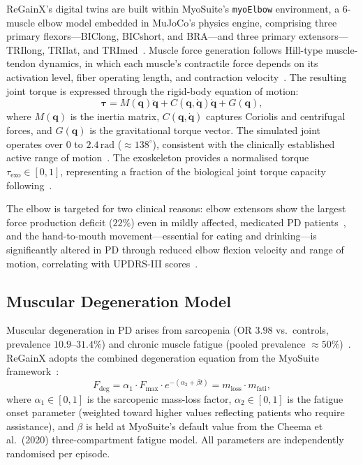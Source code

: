 \documentclass{article}
\begin{document}
ReGainX's digital twins are built within MyoSuite's \texttt{myoElbow}
environment, a 6-muscle elbow model embedded in MuJoCo's physics engine,
comprising three primary flexors---BIClong, BICshort, and BRA---and three
primary extensors---TRIlong, TRIlat, and TRImed~\citep{caggiano2022}.
Muscle force generation follows Hill-type muscle-tendon dynamics, in which
each muscle's contractile force depends on its activation level, fiber
operating length, and contraction velocity~\citep{zajac1989}. The
resulting joint torque is expressed through the rigid-body equation of
motion:
\begin{equation}
  \boldsymbol{\tau} = M(\mathbf{q})\ddot{\mathbf{q}}
    + C(\mathbf{q}, \dot{\mathbf{q}})\dot{\mathbf{q}}
    + G(\mathbf{q}),
\end{equation}
where $M(\mathbf{q})$ is the inertia matrix, $C(\mathbf{q},\dot{\mathbf{q}})$
captures Coriolis and centrifugal forces, and $G(\mathbf{q})$ is the
gravitational torque vector. The simulated joint operates over $0$ to
$2.4\,\mathrm{rad}$ ($\approx 138^\circ$), consistent with the clinically
established active range of motion~\citep{cools2017, morrey1981}. The
exoskeleton provides a normalised torque $\tau_\text{exo} \in [0,1]$,
representing a fraction of the biological joint torque capacity
following~\citet{durandau2019}.

The elbow is targeted for two clinical reasons: elbow extensors show
the largest force production deficit ($22\%$) even in mildly affected,
medicated PD patients~\citep{ingram2021}, and the hand-to-mouth
movement---essential for eating and drinking---is significantly altered in
PD through reduced elbow flexion velocity and range of motion,
correlating with UPDRS-III scores~\citep{caligiuri2018}.

\subsection{Muscular Degeneration Model}

Muscular degeneration in PD arises from sarcopenia (OR $3.98$ vs.\
controls, prevalence $10.9$--$31.4\%$) and chronic muscle fatigue
(pooled prevalence $\approx 50\%$)~\citep{hart2023, ponsoni2023, siciliano2024}.
ReGainX adopts the combined degeneration equation from the MyoSuite
framework~\citep{caggiano2022}:
\begin{equation}
  F_\text{deg} = \alpha_1 \cdot F_\text{max}
    \cdot e^{-(\alpha_2 + \beta t)}
    = m_\text{loss} \cdot m_\text{fati},
\end{equation}
where $\alpha_1 \in [0,1]$ is the sarcopenic mass-loss factor,
$\alpha_2 \in [0,1]$ is the fatigue onset parameter (weighted toward
higher values reflecting patients who require assistance), and $\beta$
is held at MyoSuite's default value from the Cheema et al.\ (2020)
three-compartment fatigue model. All parameters are independently
randomised per episode.
\end{document}
